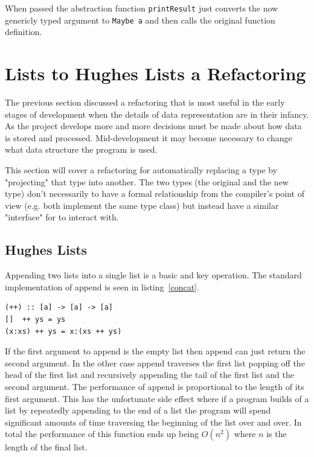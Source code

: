 When passed the abstraction function \texttt{printResult} just converts the now genericly typed argument to \texttt{Maybe a} and then calls the original function definition.
 
\section{Lists to Hughes Lists a Refactoring}\label{listToDlist}

The previous section discussed a refactoring that is most useful in the early stages of development when the details of data representation are in their infancy. As the project develops more and more decisions must be made about how data is stored and processed. Mid-development it may become necessary to change what data structure the program is used.

This section will cover a refactoring for automatically replacing a type by "projecting" that type into another. The two types (the original and the new type) don't necessarily to have a formal relationship from the compiler's point of view (e.g. both implement the same type class) but instead have a similar "interface" for to interact with. 

\subsection{Hughes Lists}

Appending two lists into a single list is a basic and key operation. The standard implementation of append is seen in listing~\ref{concat}. 

\begin{lstlisting}[caption={The standard definition of concat},label=concat]
(++) :: [a] -> [a] -> [a]
[]  ++ ys = ys
(x:xs) ++ ys = x:(xs ++ ys)
\end{lstlisting}

If the first argument to append is the empty list then append can just return the second argument. In the other case append traverses the first list popping off the head of the first list and recursively appending the tail of the first list and the second argument. The performance of append is proportional to the length of its first argument. This has the unfortunate side effect where if a program builds of a list by repeatedly appending  to the end of a list the program will spend significant amounts of time traversing the beginning of the list over and over. In total the performance of this function ends up being $O(n^2)$ where $n$ is the length of the final list.

